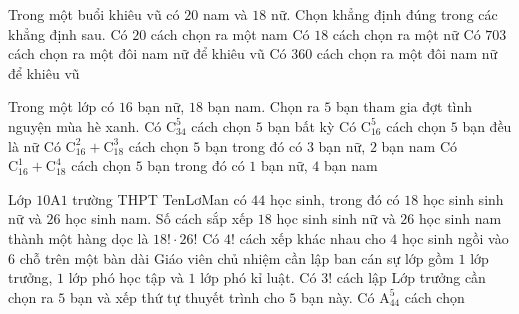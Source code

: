 \begin{ex}%
	Trong một buổi khiêu vũ có $20$ nam và $18$ nữ. Chọn khẳng  định đúng trong các khẳng định sau.
	\choiceTF 
		{\True Có $20$ cách  chọn ra một nam}
		{\True Có $18$ cách  chọn ra một nữ}
		{Có $703$ cách chọn ra một đôi nam nữ để  khiêu vũ}
		{\True Có $360$ cách chọn ra một  đôi nam nữ để khiêu vũ}
\end{ex}

\begin{ex}%
	Trong một lớp có $16$ bạn nữ, $18$ bạn nam. Chọn ra $5$  bạn tham gia đợt tình nguyện mùa hè xanh.
	 \choiceTF
		{\True Có $\mathrm{C}_{34}^{5}$ cách chọn $5$  bạn bất kỳ}
		{\True Có $\mathrm{C}_{16}^{5}$ cách chọn $5$  bạn đều là nữ}
		{Có $\mathrm{C}_{16}^{2}+\mathrm{C}_{18}^{3}$ cách  chọn $5$ bạn trong đó có $3$ bạn nữ, $2$ bạn nam}
		{Có $\mathrm{C}_{16}^{1}+\mathrm{C}_{18}^{4}$ cách chọn $5$ bạn  trong đó có $1$ bạn nữ, $4$ bạn nam}
\end{ex}

\begin{ex}%
	Lớp $10$A$1$ trường THPT TenLơMan có $44$ học sinh, trong đó  có $18$ học sinh sinh nữ và $26$ học sinh nam.
	\choiceTF 
		{Số cách sắp xếp $18$ học sinh sinh nữ và $26$ học sinh  nam thành một hàng dọc là $18!\cdot 26!$}
		{Có $4!$ cách  xếp khác nhau cho $4$ học sinh ngồi vào $6$ chỗ trên một bàn dài}
		{Giáo viên chủ nhiệm cần lập ban cán sự lớp gồm $1$ lớp trưởng, $1$  lớp phó học tập và $1$ lớp phó kỉ luật. Có $3!$ cách lập}
		{\True Lớp trưởng cần chọn ra $5$ bạn và xếp thứ tự thuyết trình cho $5$ bạn này. Có $\mathrm{A}_{44}^5$ cách chọn} 
\end{ex}

